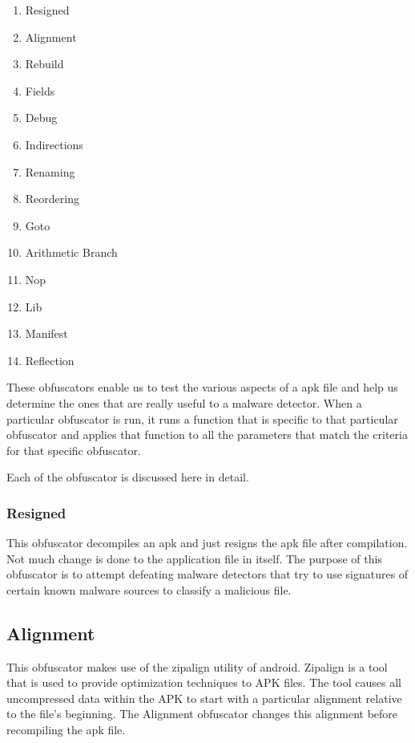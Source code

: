 \begin{enumerate}
	 \item  Resigned
	 \item  Alignment
	 \item  Rebuild
	 \item  Fields
	 \item  Debug
	 \item  Indirections
	 \item  Renaming
	 \item  Reordering
	 \item  Goto
	 \item  Arithmetic Branch
	 \item  Nop
	 \item  Lib
	 \item  Manifest
	 \item  Reflection
\end{enumerate}

These obfuscators enable us to test the various aspects of a apk file and help us determine the ones that are really useful to a malware detector. When a particular obfuscator is run, it runs a function that is specific to that particular obfuscator and applies that function to all the parameters that match the criteria for that specific obfuscator.

Each of the obfuscator is discussed here in detail. 

\subsubsection{Resigned}

This obfuscator decompiles an apk and just resigns the apk file after compilation. Not much change is done to the application file in itself. The purpose of this obfuscator is to attempt defeating malware detectors that try to use signatures of certain known malware sources to classify a malicious file.

\subsection{Alignment}

This obfuscator makes use of the zipalign utility of android. Zipalign is a tool that is used to provide optimization techniques to APK files. The tool causes all uncompressed data within the APK to start with a particular alignment relative to the file's beginning. The Alignment obfuscator changes this alignment before recompiling the apk file.

